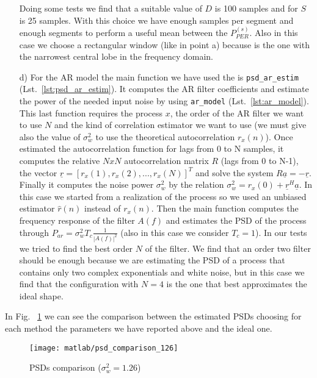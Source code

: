 \documentclass{article}
\newcommand{\inlinecode}[1]{\lstinline[basicstyle=\ttfamily,
    keywordstyle={}]{#1}}
\renewcommand{\vec}[1]{\underline{#1}}
\begin{document}
\begin{itemize}
\newline Doing some tests we find that a suitable value of $D$ is 100 samples and for $S$ is 25 samples. With this choice we have enough samples per segment and enough segments to perform a useful mean between the $P_{PER}^{(s)}$.
\newline Also in this case we choose a rectangular window (like in point a) because is the one with the narrowest central lobe in the frequency domain.
\item[d)]For the AR model the main function we have used the is \inlinecode{psd_ar_estim} (Lst.~\ref{lst:psd_ar_estim}). It computes the AR filter coefficients  and estimate the power of the needed input noise by using \inlinecode{ar_model} (Lst.~\ref{lst:ar_model}). This last function requires the process $x$, the order of the AR filter we want to use $N$ and the kind of correlation estimator we want to use (we must give also the value of $\sigma_w^2$ to use the theoretical autocorrelation $r_x (n)$). Once estimated the autocorrelation function for lags from 0 to N samples, it computes the relative $NxN$ autocorrelation matrix $R$ (lags from 0 to N-1), the vector $\vec{r} = [r_x (1), r_x (2), ...,r_x (N)]^T$ and solve the system $R \vec{a} = - \vec{r}$. Finally it computes the noise power $\sigma_w^2$ by the relation $\sigma_w^2 = r_x(0) + \vec{r}^H \vec{a}$. In this case we started from a realization of the process so we used an unbiased estimator $\hat{r}(n)$ instead of $r_x (n)$. 
\newline Then the main function computes the frequency response of the filter $A(f)$ and estimates the PSD of the process through $P_{ar} = \sigma_w^2 T_c \frac{1}{|A(f)|^2}$ (also in this case we consider $T_c=1$).
\newline In our tests we tried to find the best order $N$ of the filter. We find that an order two filter should be enough because we are estimating the PSD of a process that contains only two complex exponentials and white noise, but in this case we find that the configuration with $N = 4$  is the one that best approximates the ideal shape.
\end{itemize}
In Fig. ~\ref{plot:psd_comparison_126} we can see the comparison between the estimated PSDs choosing for each method the parameters we have reported above and the ideal one.
\begin{figure}[htbp]
  \centering
  \texttt{[image: matlab/psd\_comparison\_126]}
  \caption{PSDs comparison ($\sigma_w^2 = 1.26$)}
    \label{plot:psd_comparison_126}
\end{figure}
\end{document}
